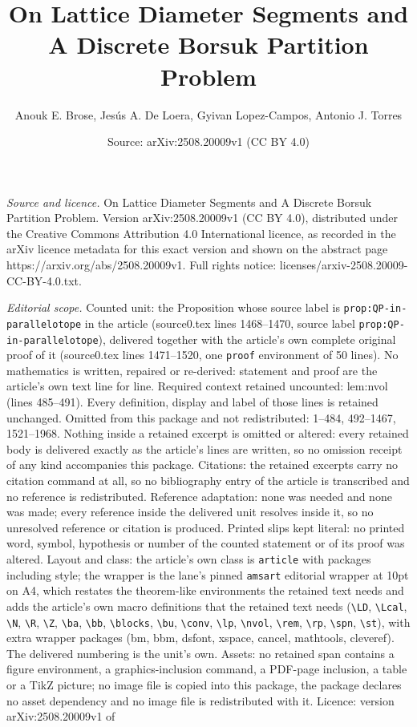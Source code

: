\documentclass[10pt,a4paper]{amsart}
\title[On Lattice Diameter Segments and A Discrete Borsuk Partition]{On Lattice Diameter Segments and A Discrete Borsuk Partition Problem}
\author{Anouk E. Brose, Jes\'us A. De Loera, Gyivan Lopez-Campos, Antonio J. Torres}
\date{Source: arXiv:2508.20009v1 (CC BY 4.0)}
\begin{document}
\maketitle

\noindent\emph{Source and licence.} On Lattice Diameter Segments and A Discrete Borsuk Partition Problem. Version arXiv:2508.20009v1 (CC BY 4.0), distributed under the Creative Commons Attribution 4.0 International licence, as recorded in the arXiv licence metadata for this exact version and shown on the abstract page https://arxiv.org/abs/2508.20009v1. Full rights notice: licenses/arxiv-2508.20009-CC-BY-4.0.txt.\par\smallskip

\noindent\textit{Editorial scope.} Counted unit: the Proposition whose source label is \texttt{prop:QP-in-parallelotope} in the article (source0.tex lines 1468--1470, source label \texttt{prop:QP-in-parallelotope}), delivered together with the article's own complete original proof of it (source0.tex lines 1471--1520, one \texttt{proof} environment of 50 lines). No mathematics is written, repaired or re-derived: statement and proof are the article's own text line for line. Required context retained uncounted: lem:nvol (lines 485--491). Every definition, display and label of those lines is retained unchanged. Omitted from this package and not redistributed: 1--484, 492--1467, 1521--1968. Nothing inside a retained excerpt is omitted or altered: every retained body is delivered exactly as the article's lines are written, so no omission receipt of any kind accompanies this package. Citations: the retained excerpts carry no citation command at all, so no bibliography entry of the article is transcribed and no reference is redistributed. Reference adaptation: none was needed and none was made; every reference inside the delivered unit resolves inside it, so no unresolved reference or citation is produced. Printed slips kept literal: no printed word, symbol, hypothesis or number of the counted statement or of its proof was altered. Layout and class: the article's own class is \texttt{article} with packages including style; the wrapper is the lane's pinned \texttt{amsart} editorial wrapper at 10pt on A4, which restates the theorem-like environments the retained text needs and adds the article's own macro definitions that the retained text needs (\texttt{\textbackslash LD}, \texttt{\textbackslash Lcal}, \texttt{\textbackslash N}, \texttt{\textbackslash R}, \texttt{\textbackslash Z}, \texttt{\textbackslash ba}, \texttt{\textbackslash bb}, \texttt{\textbackslash blocks}, \texttt{\textbackslash bu}, \texttt{\textbackslash conv}, \texttt{\textbackslash lp}, \texttt{\textbackslash nvol}, \texttt{\textbackslash rem}, \texttt{\textbackslash rp}, \texttt{\textbackslash spn}, \texttt{\textbackslash st}), with extra wrapper packages (bm, bbm, dsfont, xspace, cancel, mathtools, cleveref). The delivered numbering is the unit's own. Assets: no retained span contains a figure environment, a graphics-inclusion command, a PDF-page inclusion, a table or a TikZ picture; no image file is copied into this package, the package declares no asset dependency and no image file is redistributed with it. Licence: version arXiv:2508.20009v1 of 
\end{document}
